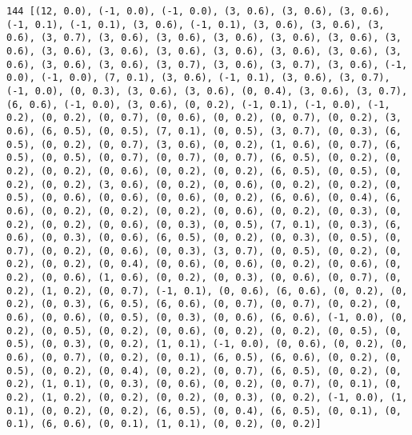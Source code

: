 \documentclass[11pt]{article}
\begin{document}
\begin{Verbatim}[commandchars=\\\{\}]
144 [(12, 0.0), (-1, 0.0), (-1, 0.0), (3, 0.6), (3, 0.6), (3, 0.6), (-1, 0.1), (-1, 0.1), (3, 0.6), (-1, 0.1), (3, 0.6), (3, 0.6), (3, 0.6), (3, 0.7), (3, 0.6), (3, 0.6), (3, 0.6), (3, 0.6), (3, 0.6), (3, 0.6), (3, 0.6), (3, 0.6), (3, 0.6), (3, 0.6), (3, 0.6), (3, 0.6), (3, 0.6), (3, 0.6), (3, 0.6), (3, 0.7), (3, 0.6), (3, 0.7), (3, 0.6), (-1, 0.0), (-1, 0.0), (7, 0.1), (3, 0.6), (-1, 0.1), (3, 0.6), (3, 0.7), (-1, 0.0), (0, 0.3), (3, 0.6), (3, 0.6), (0, 0.4), (3, 0.6), (3, 0.7), (6, 0.6), (-1, 0.0), (3, 0.6), (0, 0.2), (-1, 0.1), (-1, 0.0), (-1, 0.2), (0, 0.2), (0, 0.7), (0, 0.6), (0, 0.2), (0, 0.7), (0, 0.2), (3, 0.6), (6, 0.5), (0, 0.5), (7, 0.1), (0, 0.5), (3, 0.7), (0, 0.3), (6, 0.5), (0, 0.2), (0, 0.7), (3, 0.6), (0, 0.2), (1, 0.6), (0, 0.7), (6, 0.5), (0, 0.5), (0, 0.7), (0, 0.7), (0, 0.7), (6, 0.5), (0, 0.2), (0, 0.2), (0, 0.2), (0, 0.6), (0, 0.2), (0, 0.2), (6, 0.5), (0, 0.5), (0, 0.2), (0, 0.2), (3, 0.6), (0, 0.2), (0, 0.6), (0, 0.2), (0, 0.2), (0, 0.5), (0, 0.6), (0, 0.6), (0, 0.6), (0, 0.2), (6, 0.6), (0, 0.4), (6, 0.6), (0, 0.2), (0, 0.2), (0, 0.2), (0, 0.6), (0, 0.2), (0, 0.3), (0, 0.2), (0, 0.2), (0, 0.6), (0, 0.3), (0, 0.5), (7, 0.1), (0, 0.3), (6, 0.6), (0, 0.3), (0, 0.6), (6, 0.5), (0, 0.2), (0, 0.3), (0, 0.5), (0, 0.7), (0, 0.2), (0, 0.6), (0, 0.3), (3, 0.7), (0, 0.5), (0, 0.2), (0, 0.2), (0, 0.2), (0, 0.4), (0, 0.6), (0, 0.6), (0, 0.2), (0, 0.6), (0, 0.2), (0, 0.6), (1, 0.6), (0, 0.2), (0, 0.3), (0, 0.6), (0, 0.7), (0, 0.2), (1, 0.2), (0, 0.7), (-1, 0.1), (0, 0.6), (6, 0.6), (0, 0.2), (0, 0.2), (0, 0.3), (6, 0.5), (6, 0.6), (0, 0.7), (0, 0.7), (0, 0.2), (0, 0.6), (0, 0.6), (0, 0.5), (0, 0.3), (0, 0.6), (6, 0.6), (-1, 0.0), (0, 0.2), (0, 0.5), (0, 0.2), (0, 0.6), (0, 0.2), (0, 0.2), (0, 0.5), (0, 0.5), (0, 0.3), (0, 0.2), (1, 0.1), (-1, 0.0), (0, 0.6), (0, 0.2), (0, 0.6), (0, 0.7), (0, 0.2), (0, 0.1), (6, 0.5), (6, 0.6), (0, 0.2), (0, 0.5), (0, 0.2), (0, 0.4), (0, 0.2), (0, 0.7), (6, 0.5), (0, 0.2), (0, 0.2), (1, 0.1), (0, 0.3), (0, 0.6), (0, 0.2), (0, 0.7), (0, 0.1), (0, 0.2), (1, 0.2), (0, 0.2), (0, 0.2), (0, 0.3), (0, 0.2), (-1, 0.0), (1, 0.1), (0, 0.2), (0, 0.2), (6, 0.5), (0, 0.4), (6, 0.5), (0, 0.1), (0, 0.1), (6, 0.6), (0, 0.1), (1, 0.1), (0, 0.2), (0, 0.2)]

\end{Verbatim}
\end{document}
